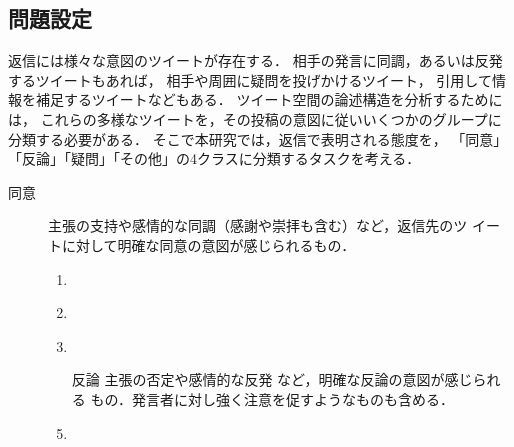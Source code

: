 \documentclass[japanese]{jnlp_1.4}
\newcommand{\addspan}[1]{}
\begin{document}
\subsection{問題設定}
\label{sec:classification_setting}

返信には様々な意図のツイートが存在する．
相手の発言に同調，あるいは反発するツイートもあれば，
相手や周囲に疑問を投げかけるツイート，
引用して情報を補足するツイートなどもある．
ツイート空間の論述構造を分析するためには，
これらの多様なツイートを，その投稿の意図に従いいくつかのグループに分類する必要がある．
そこで本研究では，返信で表明される態度を，
「同意」「反論」「疑問」「その他」の4クラスに分類するタスクを考える．
\addspan{
それぞれのクラスの定義と，その例を以下に示す．例は，上のツイートに対して，
下のツイートが返信である．
}

\begin{description}
 \item[同意] 主張の支持\addspan{(\ref{ex:agree1})(\ref{ex:agree2})}や感情的な同調（感謝や崇拝\addspan{(\ref{ex:agree3})}も含む）など，返信先のツ
	    イートに対して明確な同意の意図が感じられるもの．
	    \begin{enumerate}
     \item \addspan{…コスモ石油千葉製油所LPGタンクの爆発により、千葉県、近隣圏に在住の方に有害物質が雨などと一緒に飛散するという虚偽のチェーンメールが送られています。千葉県消防地震防災課に確認したところ、そのようなことはないと確認できました。…\\ 
	$\Rightarrow$ 本当ですか　安心です} \label{ex:agree1}
	     \item \addspan{コスモ石油が否定　「火災で有害物質降る」のメール連鎖 http://...\\
	$\Rightarrow$ デマです。みんな冷静になろう。} \label{ex:agree2}
	     \item \addspan{天皇陛下は、宮内庁が京都御所に避難してほしいと要望した
		   のを…お断りになったそうじゃないか。…私は心から尊敬
		   します。\\
	$\Rightarrow$ 天皇陛下！万歳！＼(T-T)／}
		   \label{ex:agree3}
 \item[反論] 主張の否定\addspan{(\ref{ex:counter1})}や感情的な反発
	     \addspan{(\ref{ex:counter2})(\ref{ex:counter3})}など，明確な反論の意図が感じられる
	     もの．発言者に対し強く注意を促すようなもの\addspan{(\ref{ex:counter4})}も含める．
	     \item \addspan{…コスモ石油の爆発で有害物質の雨が降る件はデマ。
		   広げてしまった方はツイート削除の上、訂正を／コスモ石油
		   が否定… \\
}
\end{enumerate}
\end{description}
\end{document}
